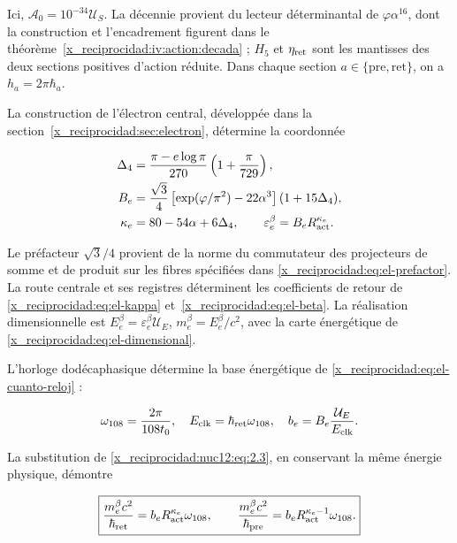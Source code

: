 Ici, \(\mathcal A_0=10^{-34}\mathcal U_S\). La décennie provient du lecteur déterminantal de \(\varphi\alpha^{16}\), dont la construction et l’encadrement figurent dans le théorème~\ref{x_reciprocidad:iv:action:decada} ; \(H_5\) et \(\eta_{\rm ret}\) sont les mantisses des deux sections positives d’action réduite. Dans chaque section \(a\in\{\mathrm{pre},\mathrm{ret}\}\), on a \(h_a=2\pi\hbar_a\).

La construction de l’électron central, développée dans la section~\ref{x_reciprocidad:sec:electron}, détermine la coordonnée



\begin{equation}
\begin{aligned}
\Delta_4&=\frac{\pi-e\log\pi}{270}\left(1+\frac{\pi}{729}\right),\\
B_e&=\frac{\sqrt3}{4}
\left[\exp(\varphi/\pi^2)-22\alpha^3\right](1+15\Delta_4),\\
\kappa_e&=80-54\alpha+6\Delta_4,\qquad
\varepsilon_e^\beta=B_eR_{\rm act}^{\kappa_e}.
\end{aligned}
\label{x_reciprocidad:nuc12:eq:2.3}
\end{equation}



Le préfacteur \(\sqrt3/4\) provient de la norme du commutateur des projecteurs de somme et de produit sur les fibres spécifiées dans \eqref{x_reciprocidad:eq:el-prefactor}. La route centrale et ses registres déterminent les coefficients de retour de \eqref{x_reciprocidad:eq:el-kappa} et~\eqref{x_reciprocidad:eq:el-beta}. La réalisation dimensionnelle est \(E_e^\beta=\varepsilon_e^\beta\mathcal U_E\), \(m_e^\beta=E_e^\beta/c^2\), avec la carte énergétique de \eqref{x_reciprocidad:eq:el-dimensional}.


L’horloge dodécaphasique détermine la base énergétique de \eqref{x_reciprocidad:eq:el-cuanto-reloj} :



\[
\omega_{108}=\frac{2\pi}{108t_0},\quad
E_{\rm clk}=\hbar_{\rm ret}\omega_{108},\quad
b_e=B_e\frac{\mathcal U_E}{E_{\rm clk}}.
\]



La substitution de \eqref{x_reciprocidad:nuc12:eq:2.3}, en conservant la même énergie physique, démontre



\begin{equation}
\boxed{\frac{m_e^\beta c^2}{\hbar_{\rm ret}}
=b_eR_{\rm act}^{\kappa_e}\omega_{108},\qquad
\frac{m_e^\beta c^2}{\hbar_{\rm pre}}
=b_eR_{\rm act}^{\kappa_e-1}\omega_{108}.}
\label{x_reciprocidad:nuc12:eq:2.4}
\end{equation}



